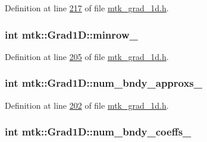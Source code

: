 Definition at line \hyperlink{mtk__grad__1d_8h_source_l00217}{217} of file \hyperlink{mtk__grad__1d_8h_source}{mtk\-\_\-grad\-\_\-1d.\-h}.

\hypertarget{classmtk_1_1Grad1D_a27b8a20e163ad803546592cc3736c12a}{
\subsubsection[{minrow\-\_\-}]{\setlength{\rightskip}{0pt plus 5cm}int mtk\-::\-Grad1\-D\-::minrow\-\_\-\hspace{0.3cm}{\ttfamily [private]}}}\label{classmtk_1_1Grad1D_a27b8a20e163ad803546592cc3736c12a}


Definition at line \hyperlink{mtk__grad__1d_8h_source_l00205}{205} of file \hyperlink{mtk__grad__1d_8h_source}{mtk\-\_\-grad\-\_\-1d.\-h}.

\hypertarget{classmtk_1_1Grad1D_abe15c1ffd9dfaba1a65f4f0e096287ce}{
\subsubsection[{num\-\_\-bndy\-\_\-approxs\-\_\-}]{\setlength{\rightskip}{0pt plus 5cm}int mtk\-::\-Grad1\-D\-::num\-\_\-bndy\-\_\-approxs\-\_\-\hspace{0.3cm}{\ttfamily [private]}}}\label{classmtk_1_1Grad1D_abe15c1ffd9dfaba1a65f4f0e096287ce}


Definition at line \hyperlink{mtk__grad__1d_8h_source_l00202}{202} of file \hyperlink{mtk__grad__1d_8h_source}{mtk\-\_\-grad\-\_\-1d.\-h}.

\hypertarget{classmtk_1_1Grad1D_a60c560882bc601f9ab1d4cd5331e55ef}{
\subsubsection[{num\-\_\-bndy\-\_\-coeffs\-\_\-}]{\setlength{\rightskip}{0pt plus 5cm}int mtk\-::\-Grad1\-D\-::num\-\_\-bndy\-\_\-coeffs\-\_\-\hspace{0.3cm}{\ttfamily [private]}}}\label{classmtk_1_1Grad1D_a60c560882bc601f9ab1d4cd5331e55ef}


